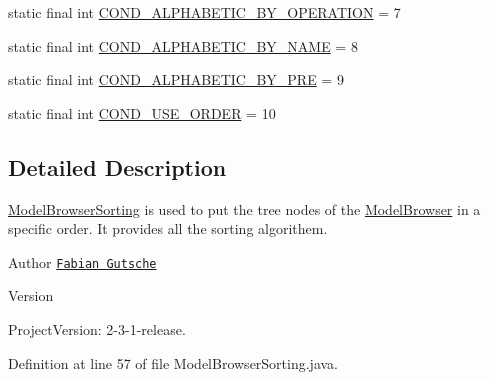 \begin{DoxyCompactItemize}
\item 
static final int \hyperlink{classorg_1_1tzi_1_1use_1_1gui_1_1main_1_1_model_browser_sorting_ad878fa5d12714c3a6ce67de74cb6c6b8}{C\-O\-N\-D\-\_\-\-A\-L\-P\-H\-A\-B\-E\-T\-I\-C\-\_\-\-B\-Y\-\_\-\-O\-P\-E\-R\-A\-T\-I\-O\-N} = 7
\item 
static final int \hyperlink{classorg_1_1tzi_1_1use_1_1gui_1_1main_1_1_model_browser_sorting_af5d11f7bd3d8287c2d932460640c4116}{C\-O\-N\-D\-\_\-\-A\-L\-P\-H\-A\-B\-E\-T\-I\-C\-\_\-\-B\-Y\-\_\-\-N\-A\-M\-E} = 8
\item 
static final int \hyperlink{classorg_1_1tzi_1_1use_1_1gui_1_1main_1_1_model_browser_sorting_a5c68258f679d84d2a935972a6c9faff2}{C\-O\-N\-D\-\_\-\-A\-L\-P\-H\-A\-B\-E\-T\-I\-C\-\_\-\-B\-Y\-\_\-\-P\-R\-E} = 9
\item 
static final int \hyperlink{classorg_1_1tzi_1_1use_1_1gui_1_1main_1_1_model_browser_sorting_a6443961964138b18d218c6b949cacd53}{C\-O\-N\-D\-\_\-\-U\-S\-E\-\_\-\-O\-R\-D\-E\-R} = 10
\end{DoxyCompactItemize}


\subsection{Detailed Description}
\hyperlink{classorg_1_1tzi_1_1use_1_1gui_1_1main_1_1_model_browser_sorting}{Model\-Browser\-Sorting} is used to put the tree nodes of the \hyperlink{classorg_1_1tzi_1_1use_1_1gui_1_1main_1_1_model_browser}{Model\-Browser} in a specific order. It provides all the sorting algorithem.

\begin{DoxyAuthor}{Author}
\href{mailto:gutsche@tzi.de}{\tt Fabian Gutsche} 
\end{DoxyAuthor}
\begin{DoxyVersion}{Version}

\end{DoxyVersion}
\begin{DoxyParagraph}{Project\-Version\-:}
2-\/3-\/1-\/release. 
\end{DoxyParagraph}


Definition at line 57 of file Model\-Browser\-Sorting.\-java.



